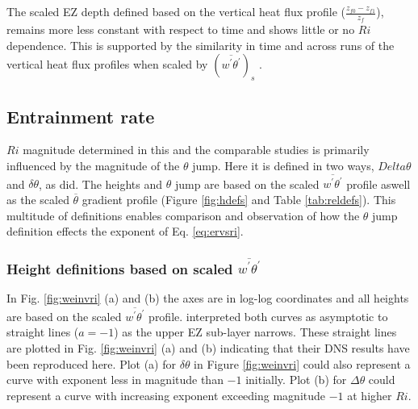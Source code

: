 \documentclass[referee]{svjour3}
\begin{document}
The scaled EZ depth defined based on the vertical heat flux profile ($\frac{z_{f0}-z_{f1}}{z_{f}}$), remains more less constant with respect to time and shows little or no $Ri$ dependence.  This is supported by the similarity in time and across runs of the vertical heat flux profiles when scaled by $(\overline{w^{'}\theta^{'}})_{s}$ \citep{Nchap14}.

\subsection{Entrainment rate}

$Ri$ magnitude determined in this and the comparable studies is primarily influenced by the magnitude of the $\theta$ jump.  Here it is defined in two ways, $Delta \theta$ and $\delta \theta$, as \cite{Fedorovich04} did.  The heights and $\theta$ jump are based on the scaled $\overline{w^{'}\theta^{'}}$ profile aswell as the scaled $\overline{\theta}$ gradient profile (Figure \ref{fig:hdefs} and Table \ref{tab:reldefs}).  This multitude of definitions enables comparison and observation of how the $\theta$ jump definition effects the exponent of Eq. \ref{eq:ervsri}.

\subsubsection{Height definitions based on scaled $\overline{w^{'}\theta^{'}}$}
In Fig. \ref{fig:weinvri} (a) and (b) the axes are in log-log coordinates and all heights are based on the scaled $\overline{w^{'}\theta^{'}}$ profile.  \cite{Garcia14} interpreted both curves as asymptotic to straight lines ($a=-1$) as the upper EZ sub-layer narrows.  These straight lines are plotted in Fig. \ref{fig:weinvri} (a) and (b) indicating that their DNS results have been reproduced here.   Plot (a) for $\delta \theta$ in Figure \ref{fig:weinvri} could also represent a curve with exponent less in magnitude than $-1$ initially.  Plot (b) for $\Delta \theta$ could represent a curve with increasing exponent exceeding magnitude $-1$ at higher $Ri$.\\
\end{document}
